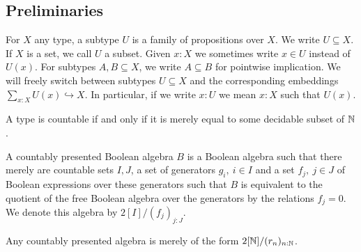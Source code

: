 \subsection{Preliminaries}
%
\begin{remark}
  For $X$ any type, a subtype $U$ is a family of propositions over $X$. 
  We write $U\subseteq X$.
  If $X$ is a set, we call $U$ a subset. Given $x:X$ we sometimes write $x\in U$ instead of $U(x)$. %
  For subtypes $A,B\subseteq X$, we write $A\subseteq B$ for pointwise implication.
  We will freely switch between subtypes $U\subseteq X$ %
  and the corresponding embeddings
  $
    \sum_{x:X}U(x) \hookrightarrow  X.
  $
In particular, if we write $x: U$ we mean $x:X$ such that $U(x)$.
\end{remark}
\begin{definition}
  A type is countable if and only if it is 
  merely equal to some decidable subset of $\mathbb{N}$. 
\end{definition}

\begin{definition}
  A countably presented Boolean algebra $B$ is a Boolean algebra such that there merely are 
  countable sets $I,J$, 
  a set of generators $g_i,~{i\in I}$ and a set $f_j,~{j\in J}$ 
  of Boolean expressions over these generators 
  such that $B$ is equivalent to the quotient of the free Boolean 
  algebra over the generators by the relations
  $f_j=0$. We denote this algebra by $2[I]/(f_j)_{j:J}$.
\end{definition} 

\begin{remark}\label{BooleAsCQuotient}
Any countably presented algebra is merely of the form 
$2[\mathbb{N}]/ (r_n)_{n:\mathbb{N}}$.
\end{remark}



